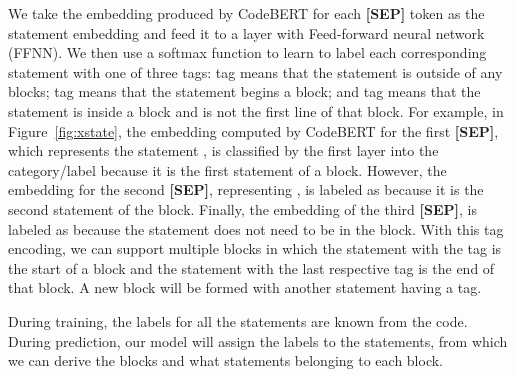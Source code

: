 We take the embedding produced by CodeBERT for each {\bf [SEP]} token
as the statement embedding and feed it to a layer with
Feed-forward neural network (FFNN). We then use a softmax function to
learn to label each corresponding statement with one of three tags:
 tag means that the statement is outside of any
 blocks;  tag means that the statement
begins a  block; and  tag means that the
statement is inside a  block and is not the first line
of that block. For example, in Figure~\ref{fig:xstate}, the embedding
computed by CodeBERT for the first {\bf [SEP]}, which represents the
statement , is classified by the first
 layer into the  category/label because
it is the first statement of a  block. However, the
embedding for the second {\bf [SEP]}, representing
, is labeled as  because it
is the second statement of the  block. Finally, the
embedding of the third {\bf [SEP]}, is labeled as  because the
statement  does not need to be in the
 block. With this tag encoding, we can support
multiple  blocks in which the statement with the
 tag is the start of a  block and the
statement with the last respective  tag is the end of that
block. A new block will be formed with another statement having a
 tag.




During training, the labels for all the statements are known from the
code.  During prediction, our model will assign the labels to the
statements, from which we can derive the  blocks and
what statements belonging to each block.








